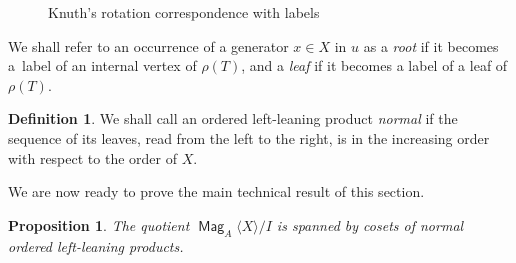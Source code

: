 \documentclass[10pt,a4paper]{article}
\newtheorem{prop}[theo]{Proposition}
\theoremstyle{definition}
\newtheorem{defi}[theo]{Definition}
\numberwithin{equation}{section}
\numberwithin{figure}{section}
\DeclareMathOperator{\Mag}{\mathsf{Mag}}
\begin{document}
\begin{figure}[h]
\centering
{}
\caption{Knuth's rotation correspondence with labels}\label{fig2}
\end{figure}

We shall refer to an occurrence of a generator $x\in X$ in $u$ as a
\emph{root} if it becomes a~label of an internal vertex of $\rho(T)$, and a
\emph{leaf} if it becomes a label of a leaf of $\rho(T)$.

\begin{defi}\label{normal}
We shall call an ordered left-leaning product \emph{normal} if the sequence of its leaves, read from the left to the right, is in the increasing order with respect to the order of $X$.
\end{defi}

We are now ready to prove the main technical result of this section.

\begin{prop}\label{normal_coset}
The quotient $\Mag_A\langle X\rangle/I$ is spanned by cosets of normal ordered left-leaning products.
\end{prop}
\end{document}
